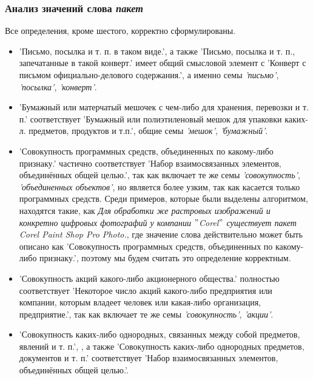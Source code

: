 \documentclass[LI,VKR]{HSEUniversity}
\begin{document}
\subsubsection*{Анализ значений слова \textit{пакет}}

Все определения, кроме шестого, корректно сформулированы.

\begin{itemize}
    \item ’Письмо, посылка и т. п. в таком виде.’, а также
’Письмо, посылка и т. п., запечатанные в такой конверт.’ имеет общий смысловой элемент с
’Конверт с письмом официально-делового содержания.’, а именно семы \textit{’письмо’}, \textit{’посылка’}, \textit{’конверт’}.

    \item ’Бумажный или матерчатый мешочек с чем-либо для хранения, перевозки и т. п.’ соответствует
’Бумажный или полиэтиленовый мешок для упаковки каких-л. предметов, продуктов и т.п.’,
общие семы \textit{’мешок’}, \textit{’бумажный’}.

    \item ’Совокупность программных средств, объединенных по какому-либо признаку.’ частично соответствует
’Набор взаимосвязанных элементов, объединённых общей целью.’,
так как включает те же семы \textit{’совокупность’}, \textit{’объединенных объектов’},
но является более узким, так как касается только программных средств.
Среди примеров, которые были выделены алгоритмом, находятся такие, как
\textit{Для обработки же растровых изображений и конкретно цифровых фотографий у компании \("\)Corel\("\)
существует пакет Corel Paint Shop Pro Photo.}, где значение слова действительно может
быть описано как ’Совокупность программных средств, объединенных по какому-либо признаку.’,
поэтому мы будем считать это определение корректным.

    \item ’Совокупность акций какого-либо акционерного общества.’ полностью соответствует
’Некоторое число акций какого-либо предприятия или компании, которым владеет человек или какая-либо организация, предприятие.’,
так как включает те же семы \textit{’совокупность’}, \textit{’акции’}.

    \item ’Совокупность каких-либо однородных, связанных между собой предметов, явлений и т. п.’,
, а также ’Совокупность каких-либо однородных предметов, документов и т. п.’
соответствует ’Набор взаимосвязанных элементов, объединённых общей целью.’.  %
\end{itemize}
\end{document}
